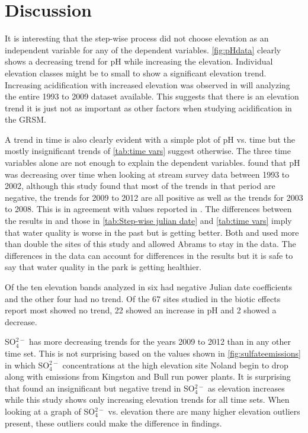 \section{Discussion}
\label{sec:TADiscussion}

It is interesting that the step-wise process did not choose elevation as an independent variable for any of the dependent variables. 
\autoref{fig:pHdata} clearly shows a decreasing trend for pH while increasing the elevation. Individual elevation classes might be to small to show a significant elevation trend. 
 Increasing acidification with increased elevation was observed in \citet{cai2012} will analyzing the entire 1993 to 2009 dataset available.  
This suggests that there is an elevation trend it is just not as important as other factors when studying acidification in the GRSM.%

A trend in time is also clearly evident with a simple plot of pH vs. time but the mostly insignificant trends of \autoref{tab:time vars} suggest otherwise.
 The three time variables alone are not enough to explain the dependent variables. 
 \citet{robinson2008ph} found that pH was decreasing over time when looking at stream survey data between 1993 to 2002, although this study found that most of the trends in that period are negative, the trends for 2009 to 2012 are all positive as well as the trends for 2003 to 2008.  This is in agreement with values reported in \citet{cai2012}.  
The differences between the results in \citet{robinson2008ph} and those in \autoref{tab:Step-wise julian date} and \autoref{tab:time vars} imply that water quality is worse in the past but is getting better.  
Both \citet{robinson2008ph} and \citet{cai2012} used more than double the sites of this study and \citet{robinson2008ph} allowed Abrams to stay in the data.  
The differences in the data can account for differences in the results but it is safe to say that water quality in the park is getting healthier.

Of the ten elevation bands analyzed in \citet{robinson2008ph} six had negative Julian date coefficients and the other four had no trend.
Of the 67 sites studied in the biotic effects report most showed no trend, 22 showed an increase in pH and 2 showed a decrease\citep{cai2012}. 

SO$_4^{2-}$ has more decreasing trends for the years 2009 to 2012 than in any other time set. 
This is not surprising based on the values shown in \autoref{fig:sulfateemissions} in which SO$_4^{2-}$ concentrations at the high elevation site Noland begin to drop along with emissions from Kingston and Bull run power plants. 
 It is surprising that \cite{cai2012} found an insignificant but negative trend in SO$_4^{2-}$ as elevation increases while this study shows only increasing elevation trends for all time sets.  
When looking at a graph of SO$_4^{2-}$ vs. elevation there are many higher elevation outliers present, these outliers could make the difference in findings.%

